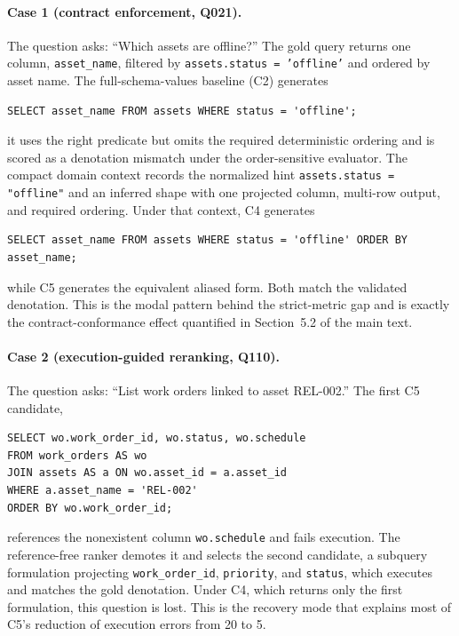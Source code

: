 \documentclass[11pt]{article}
\begin{document}
\paragraph{Case 1 (contract enforcement, Q021).} The question asks: ``Which assets are offline?'' The gold query returns one column, \texttt{asset\_name}, filtered by \texttt{assets.status = 'offline'} and ordered by asset name. The full-schema-values baseline (C2) generates
\begin{small}
\begin{verbatim}
SELECT asset_name FROM assets WHERE status = 'offline';
\end{verbatim}
\end{small}
it uses the right predicate but omits the required deterministic ordering and is scored as a denotation mismatch under the order-sensitive evaluator. The compact domain context records the normalized hint \texttt{assets.status = "offline"} and an inferred shape with one projected column, multi-row output, and required ordering. Under that context, C4 generates
\begin{small}
\begin{verbatim}
SELECT asset_name FROM assets WHERE status = 'offline' ORDER BY asset_name;
\end{verbatim}
\end{small}
while C5 generates the equivalent aliased form. Both match the validated denotation. This is the modal pattern behind the strict-metric gap and is exactly the contract-conformance effect quantified in Section~5.2 of the main text.

\paragraph{Case 2 (execution-guided reranking, Q110).} The question asks: ``List work orders linked to asset REL-002.'' The first C5 candidate,
\begin{small}
\begin{verbatim}
SELECT wo.work_order_id, wo.status, wo.schedule
FROM work_orders AS wo
JOIN assets AS a ON wo.asset_id = a.asset_id
WHERE a.asset_name = 'REL-002'
ORDER BY wo.work_order_id;
\end{verbatim}
\end{small}
references the nonexistent column \texttt{wo.schedule} and fails execution. The reference-free ranker demotes it and selects the second candidate, a subquery formulation projecting \texttt{work\_order\_id}, \texttt{priority}, and \texttt{status}, which executes and matches the gold denotation. Under C4, which returns only the first formulation, this question is lost. This is the recovery mode that explains most of C5's reduction of execution errors from 20 to 5.
\end{document}
